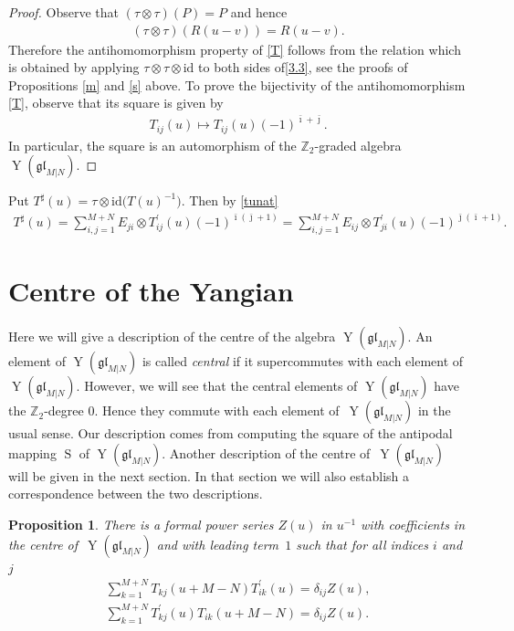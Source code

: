 \documentclass[10pt,a4paper]{amsart}
\numberwithin{equation}{section}
\newtheorem{Proposition}[Theorem]{Proposition}
\def\bi{{\bar\imath }}
\def\bj{{\bar\jmath }}
\def\glMN{\mathfrak{gl}_{M|N}}
\def\id{{\mathrm{id}}}
\def\ot{\otimes}
\def\S{\operatorname{S}}
\def\TP{T^{\prime}}
\def\TS{T^{\sharp}}
\def\YMN{\operatorname{Y}(\glMN)}
\def\ZZ{\mathbb{Z}}
\begin{document}
\begin{proof}
Observe that $(\tau\ot\tau)(P)=P$ and hence
\begin{gather}
\label{Rtt}
(\tau\ot\tau)(R(u-v))=R(u-v) .
\end{gather}
Therefore the antihomomorphism property of \eqref{T}
follows from the relation which is obtained by applying
$\tau\ot\tau\ot\id$ to both sides of\eqref{3.3},
see the proofs of Propositions \ref{m} and \ref{s} above.
To prove the bijectivity of
the antihomomorphism \eqref{T}, observe
that its square is given by %
\begin{gather*}
T_{ij}(u)\mapsto T_{ij}(u)
{(-1)}^{\bi+ \bj} .
\end{gather*}
In particular, the square is an automorphism of the $\ZZ_2$-graded
algebra $\YMN $.
\end{proof}

Put
$\TS(u)=\tau \ot\id \big( T(u)^{-1} \big) $.
Then by \eqref{tunat}
\begin{gather}\label{tsu}
\TS(u)=
\sum_{i,j=1}^{M+N} E_{ji}\ot\TP_{ij}(u)
{(-1)}^{\bi ( \bj + 1)}=
\sum_{i,j=1}^{M+N} E_{ij}\ot\TP_{ji}(u)
{(-1)}^{\bj ( \bi + 1)} .
\end{gather}

\section{Centre of the Yangian}\label{sec:2}

Here we will give a description of the centre of the
algebra $\YMN $. An element of $\YMN$ is called
\emph {central} if it supercommutes with each element of $\YMN $.
However, we will see that the central elements of $\YMN$ have
the $\ZZ_{2}$-degree $0 $.
Hence they commute with each
element of~$\YMN$ in the usual sense.
Our description comes from computing the square of the antipodal mapping $\S$ of $\YMN $.
Another description of the centre of~$\YMN $ will be
given in the next section. In that section we will also establish a
correspondence between the two descriptions.


\begin{Proposition}\label{zu} There is a formal power series $Z(u)$ in $u^{-1}$ with coefficients in
the centre of~$\YMN$ and with
leading term~$1$ such that for all indices $i$ and $j$
\begin{gather}\label{zetav}
\sum_{k=1}^{M+N}T_{kj}(u+M-N) \TP_{ik}(u) =\delta_{ij} Z(u) ,\\
\label{zetau}
\sum_{k=1}^{M+N}
\TP_{kj}(u) T_{ik}(u+M-N) =\delta_{ij} Z(u) .
\end{gather}
\end{Proposition}
\end{document}
